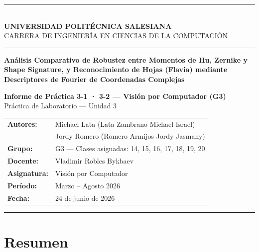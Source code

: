 \documentclass[12pt,a4paper]{article}
\begin{document}

\begin{titlepage}
  \centering
  \rule{\linewidth}{1.5pt}\\[0.4cm]
  {\large\bfseries UNIVERSIDAD POLITÉCNICA SALESIANA}\\[0.1cm]
  {\normalsize CARRERA DE INGENIERÍA EN CIENCIAS DE LA COMPUTACIÓN}\\[0.2cm]
  \rule{\linewidth}{0.8pt}

  \vspace{2cm}

  \parbox{0.85\textwidth}{\centering\LARGE\bfseries\color{salesiana}
    Análisis Comparativo de Robustez entre Momentos de Hu, Zernike
    y Shape Signature, y Reconocimiento de Hojas (Flavia) mediante
    Descriptores de Fourier de Coordenadas Complejas
  }

  \vspace{1.5cm}

  {\large\bfseries Informe de Práctica 3-1 · 3-2 — Visión por Computador (G3)}\\[0.2cm]
  {\normalsize Práctica de Laboratorio — Unidad 3}

  \vspace{1.5cm}

  \begin{tabular}{ll}
    \textbf{Autores:}    & Michael Lata (Lata Zambrano Michael Israel) \\
                         & Jordy Romero (Romero Armijos Jordy Jasmany) \\[0.3cm]
    \textbf{Grupo:}      & G3 — Clases asignadas: 14, 15, 16, 17, 18, 19, 20 \\[0.3cm]
    \textbf{Docente:}    & Vladimir Robles Bykbaev \\[0.3cm]
    \textbf{Asignatura:} & Visión por Computador \\[0.3cm]
    \textbf{Período:}    & Marzo -- Agosto 2026 \\[0.3cm]
    \textbf{Fecha:}      & 24 de junio de 2026 \\
  \end{tabular}

  \vfill
  \rule{\linewidth}{1.5pt}
\end{titlepage}

\section*{Resumen}
\end{document}
